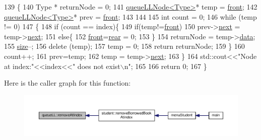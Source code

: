 \begin{DoxyCode}
139     \{
140         Type * returnNode = 0;
141         \hyperlink{classqueue_l_l_node}{queueLLNode<Type>}* temp = \hyperlink{classqueue_l_l_a622ea439d113fe8e4616320ec2346d8b}{front};
142         \hyperlink{classqueue_l_l_node}{queueLLNode<Type>}* prev = \hyperlink{classqueue_l_l_a622ea439d113fe8e4616320ec2346d8b}{front};
143 
144 
145         \textcolor{keywordtype}{int} count = 0;
146         \textcolor{keywordflow}{while} (temp != 0)
147         \{
148             \textcolor{keywordflow}{if} (count == index)\{
149                 \textcolor{keywordflow}{if}(temp!=\hyperlink{classqueue_l_l_a622ea439d113fe8e4616320ec2346d8b}{front})
150                     prev->\hyperlink{classqueue_l_l_node_ab8367d61c51828d9f21d72537b62735f}{next} = temp->\hyperlink{classqueue_l_l_node_ab8367d61c51828d9f21d72537b62735f}{next};
151                 \textcolor{keywordflow}{else}\{
152                     \hyperlink{classqueue_l_l_a622ea439d113fe8e4616320ec2346d8b}{front}=\hyperlink{classqueue_l_l_aab0540567095f05fb1c981a2e7e4e93e}{rear} = 0;
153                 \}
154                 returnNode = temp->\hyperlink{classqueue_l_l_node_a20b1170d8c5852b7dc01e56fda4e4206}{data};
155                 \hyperlink{classqueue_l_l_af2ae538d6971624f1c8404d3a8502aa0}{size}--;
156                 \textcolor{keyword}{delete} (temp);
157                 temp = 0;
158                 \textcolor{keywordflow}{return} returnNode;
159             \}
160             count++;
161             prev=temp;
162             temp = temp->\hyperlink{classqueue_l_l_node_ab8367d61c51828d9f21d72537b62735f}{next};
163         \}
164         std::cout<<\textcolor{stringliteral}{"Node at index:"}<<index<<\textcolor{stringliteral}{" does not exist\(\backslash\)n"};
165 
166         \textcolor{keywordflow}{return} 0;
167     \}
\end{DoxyCode}
Here is the caller graph for this function\+:
\nopagebreak
\begin{figure}[H]
\begin{center}
\leavevmode
\includegraphics[width=350pt]{classqueue_l_l_abe3f175ee8c25c55d18650c5b13297b1_icgraph}
\end{center}
\end{figure}


